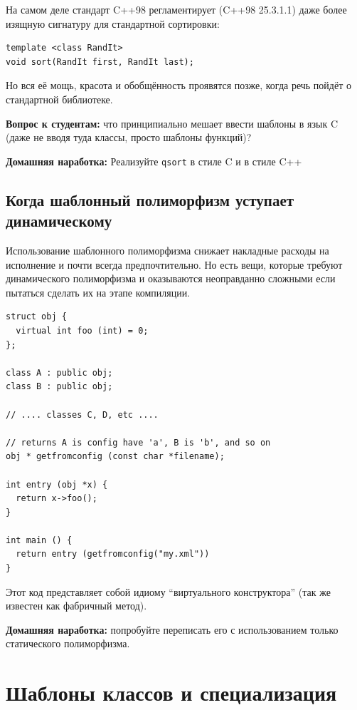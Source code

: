 \documentclass[a4paper,12pt,oneside]{book}
\newif\ifanswers
\begin{document}
На самом деле стандарт C++98 регламентирует (C++98 25.3.1.1) даже более изящную сигнатуру для стандартной сортировки:

\begin{lstlisting}
template <class RandIt>
void sort(RandIt first, RandIt last);
\end{lstlisting}

Но вся её мощь, красота и обобщённость проявятся позже, когда речь пойдёт о стандартной библиотеке.

\textbf{Вопрос к студентам:} что принципиально мешает ввести шаблоны в язык C (даже не вводя туда классы, просто шаблоны функций)?

\ifanswers
В этом случае не обойтись без манглирования имён, чего в случае C никто не хочет
\fi

\textbf{Домашняя наработка:} Реализуйте \lstinline!qsort! в стиле C и в стиле C++

\subsection{Когда шаблонный полиморфизм уступает динамическому}\label{DynamicBetterStatic}

Использование шаблонного полиморфизма снижает накладные расходы на исполнение и почти всегда предпочтительно. Но есть вещи, которые требуют динамического полиморфизма и оказываются неоправданно сложными если пытаться сделать их на этапе компиляции.

\begin{lstlisting}
struct obj {
  virtual int foo (int) = 0;    
};

class A : public obj;
class B : public obj;

// .... classes C, D, etc ....

// returns A is config have 'a', B is 'b', and so on
obj * getfromconfig (const char *filename);

int entry (obj *x) {
  return x->foo();
}

int main () {
  return entry (getfromconfig("my.xml"))
}
\end{lstlisting}

Этот код представляет собой идиому ``виртуального конструктора'' (так же известен как фабричный метод).

\textbf{Домашняя наработка:} попробуйте переписать его с использованием только статического полиморфизма.

\pagebreak
\section{Шаблоны классов и специализация}\label{ClassTemplates}
\end{document}
